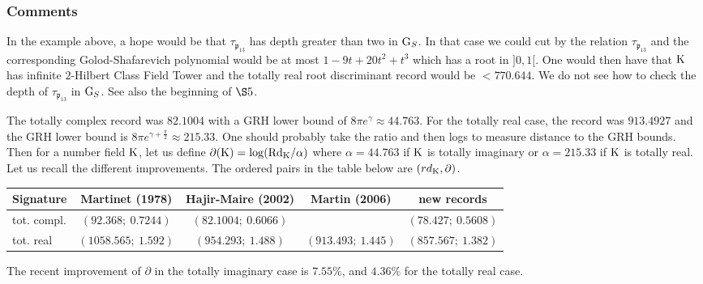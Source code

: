 \documentclass[12pt,a4paper,twoside,english]{smfart}
\def\p{{\mathfrak p}}
\def\G{{\rm G}}
\def\K{{\rm K}}
\def\Rd{{\rm Rd}}
\begin{document}
\subsubsection{Comments}

In the example above, a hope would be that  $\tau_{\p_{13}}$ has depth greater than two in $\G_S$. In that case we could
 cut by  the relation $\tau_{\p_{13}}$ and the corresponding Golod-Shafarevich polynomial would be at most
  $1-9t+20t^2 +t^3$ which has a root in $]0,1[$. One would then have that $\K$ has infinite $2$-Hilbert Class Field
  Tower and the totally real root discriminant record would  be $< 770.644$. We do not see how to check the depth
  of $\tau_{\p_{13}}$  in $\G_S$. See also the beginning of $\S 5$.  
\smallskip

The totally complex record was $82.1004$ with a GRH lower bound of $8\pi e^{\gamma} \approx 44.763$.
For the totally real case, the record was  $913.4927$  and the GRH lower bound is $ 8\pi e^{\gamma +\frac{\pi}2} \approx 215.33$.
One should probably take the ratio and then logs to  measure distance to the GRH bounds. 
Then for a number field $\K$, let us define $\partial(\K)=\log(\Rd_\K /\alpha)$ where $\alpha = 44.763$ if $\K$ is totally imaginary or $\alpha=215.33$ if $\K$ is totally real.
Let us recall the different improvements. The ordered pairs in the table below are $(rd_\K,\partial)$.

\medskip

\begin{mdframed}[style=MyFrame]
\begin{center}
\begin{tabular}{l|c|c|c|c}
Signature & Martinet  (1978) & Hajir-Maire (2002) &  Martin (2006) & new records \\
\hline
tot. compl.   &$(92.368; \  0.7244)$ & $(82.1004; \ 0.6066)$ &  & $(78.427; \ 0.5608)$  \\
\hline
tot. real  &$(1058.565;   \  1.592)$ &$(954.293; \  1.488)$  &   $(913.493; \  1.445)$ &  $(857.567;  \  1.382)$  \\
\hline
\end{tabular}
\end{center} 
\end{mdframed}


\medskip 

The recent improvement of $\partial$ in the totally imaginary case  is  $ 7.55\% $, and $4.36\% $ for the totally real case. 
\color{black}
\end{document}
